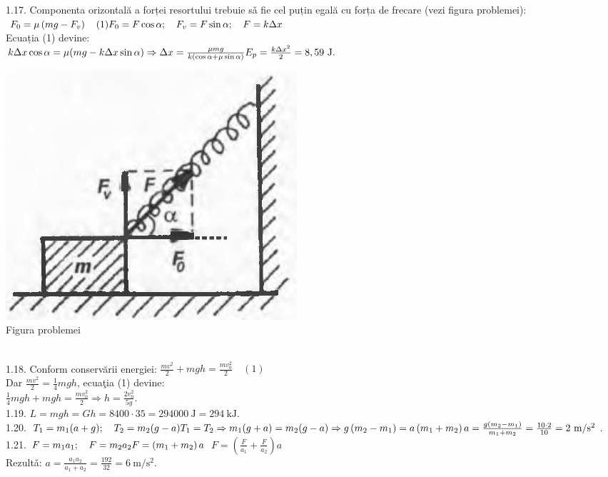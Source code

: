 1.17. Componenta orizontală a forței resortului trebuie sǎ fie cel puțin egală cu forța de frecare (vezi figura problemei): $F_{0}=\mu\left(m g-F_{v}\right) \quad(1)\\ F_{0}=F \cos \alpha ; \quad F_{v}=F \sin \alpha ; \quad F=k \Delta x$\\ Ecuația (1) devine:\\ $k \Delta x \cos \alpha=\mu(m g-k \Delta x \sin \alpha) \Rightarrow \Delta x=\frac{\mu m g}{k(\cos \alpha+\mu \sin \alpha)}\\ E_{p}=\frac{k \Delta x^{2}}{2}=8,59 \mathrm{~J}.$\\ \begin{center} \includegraphics[width=0.4\linewidth]{images/2025_07_01_5b3ff9fa0d508c8e9f17g-201}\\ Figura problemei \end{center}\\

1.18. Conform conservării energiei: $\frac{m v^{2}}{2}+m g h=\frac{m v_{0}^{2}}{2} \quad(1)$\\ Dar $\frac{m v^{2}}{2}=\frac{1}{4} m g h$, ecuaţia (1) devine:\\ $\frac{1}{4} m g h+m g h=\frac{m v_{0}^{2}}{2} \Rightarrow h=\frac{2 v_{0}^{2}}{5 g}$.\\

1.19. $L=m g h=G h=8400 \cdot 35=294000 \mathrm{~J}=294 \mathrm{~kJ}$.\\

1.20. $T_{1}=m_{1}(a+g); \quad T_{2}=m_{2}(g-a)\\ T_{1}=T_{2} \Rightarrow m_{1}(g+a)=m_{2}(g-a) \Rightarrow g\left(m_{2}-m_{1}\right)=a\left(m_{1}+m_{2}\right)\\ a=\frac{g\left(m_{2}-m_{1}\right)}{m_{1}+m_{2}}=\frac{10 \cdot 2}{10}=2 \mathrm{~m} / \mathrm{s}^{2}$.\\

1.21. $F=m_{1} a_{1}; \quad F=m_{2} a_{2}\\ F=\left(m_{1}+m_{2}\right) a$  $F=\left(\frac{F}{a_{1}}+\frac{F}{a_{2}}\right) a$\\ Rezultǎ: $a=\frac{a_{1} a_{2}}{a_{1}+a_{2}}=\frac{192}{32}=6 \mathrm{~m} / \mathrm{s}^{2}$.\\

